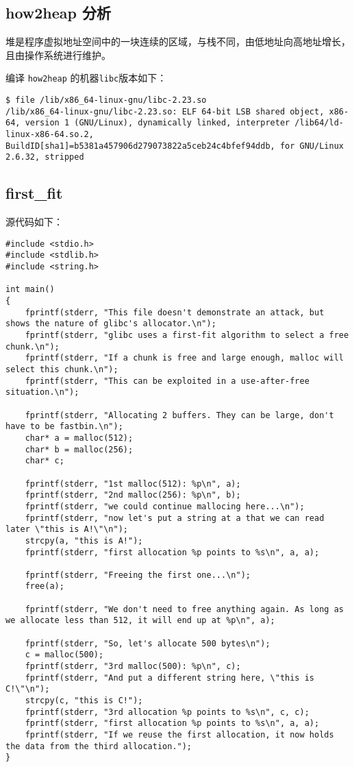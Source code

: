 \begin{center}
    \section{how2heap 分析}
\end{center}

\setlength{\parindent}{2em}
堆是程序虚拟地址空间中的一块连续的区域，与栈不同，由低地址向高地址增长，且由操作系统进行维护。

编译 \verb+how2heap+ 的机器\verb+libc+版本如下：
\begin{verbatim}
$ file /lib/x86_64-linux-gnu/libc-2.23.so
/lib/x86_64-linux-gnu/libc-2.23.so: ELF 64-bit LSB shared object, x86-64, version 1 (GNU/Linux), dynamically linked, interpreter /lib64/ld-linux-x86-64.so.2, BuildID[sha1]=b5381a457906d279073822a5ceb24c4bfef94ddb, for GNU/Linux 2.6.32, stripped
\end{verbatim}

\subsection{first\_fit}
\setlength{\parindent}{2em}

源代码如下：
\begin{verbatim}
#include <stdio.h>
#include <stdlib.h>
#include <string.h>

int main()
{
    fprintf(stderr, "This file doesn't demonstrate an attack, but shows the nature of glibc's allocator.\n");
    fprintf(stderr, "glibc uses a first-fit algorithm to select a free chunk.\n");
    fprintf(stderr, "If a chunk is free and large enough, malloc will select this chunk.\n");
    fprintf(stderr, "This can be exploited in a use-after-free situation.\n");

    fprintf(stderr, "Allocating 2 buffers. They can be large, don't have to be fastbin.\n");
    char* a = malloc(512);
    char* b = malloc(256);
    char* c;

    fprintf(stderr, "1st malloc(512): %p\n", a);
    fprintf(stderr, "2nd malloc(256): %p\n", b);
    fprintf(stderr, "we could continue mallocing here...\n");
    fprintf(stderr, "now let's put a string at a that we can read later \"this is A!\"\n");
    strcpy(a, "this is A!");
    fprintf(stderr, "first allocation %p points to %s\n", a, a);

    fprintf(stderr, "Freeing the first one...\n");
    free(a);

    fprintf(stderr, "We don't need to free anything again. As long as we allocate less than 512, it will end up at %p\n", a);

    fprintf(stderr, "So, let's allocate 500 bytes\n");
    c = malloc(500);
    fprintf(stderr, "3rd malloc(500): %p\n", c);
    fprintf(stderr, "And put a different string here, \"this is C!\"\n");
    strcpy(c, "this is C!");
    fprintf(stderr, "3rd allocation %p points to %s\n", c, c);
    fprintf(stderr, "first allocation %p points to %s\n", a, a);
    fprintf(stderr, "If we reuse the first allocation, it now holds the data from the third allocation.");
}
\end{verbatim}


